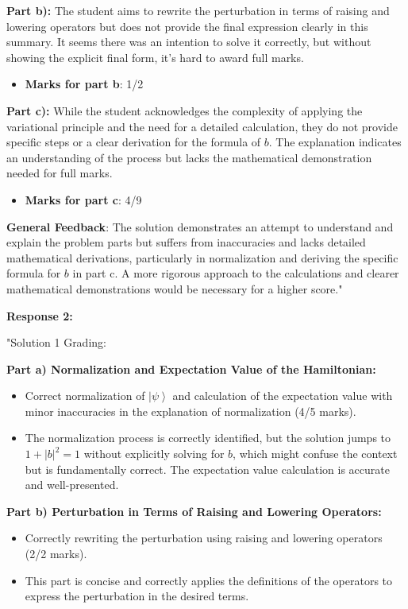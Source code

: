 \documentclass[a4paper,11pt]{article}
\begin{document}
\textbf{Part b):} The student aims to rewrite the perturbation in terms of raising and lowering operators but does not provide the final expression clearly in this summary. It seems there was an intention to solve it correctly, but without showing the explicit final form, it's hard to award full marks.
\begin{itemize}
    \item \textbf{Marks for part b}: 1/2
\end{itemize}

\textbf{Part c):} While the student acknowledges the complexity of applying the variational principle and the need for a detailed calculation, they do not provide specific steps or a clear derivation for the formula of \(b\). The explanation indicates an understanding of the process but lacks the mathematical demonstration needed for full marks.
\begin{itemize}
    \item \textbf{Marks for part c}: 4/9
\end{itemize}

\textbf{General Feedback}: The solution demonstrates an attempt to understand and explain the problem parts but suffers from inaccuracies and lacks detailed mathematical derivations, particularly in normalization and deriving the specific formula for
\(b\) in part c. A more rigorous approach to the calculations and clearer mathematical demonstrations would be necessary for a higher score."

\textbf{Response 2:}

"Solution 1 Grading:

\textbf{Part a) Normalization and Expectation Value of the Hamiltonian:}
\begin{itemize}
    \item Correct normalization of \( \left| \psi \right> \) and calculation of the expectation value with minor inaccuracies in the explanation of normalization (4/5 marks).
    \item The normalization process is correctly identified, but the solution jumps to \( 1 + |b|^2 = 1 \) without explicitly solving for \( b \), which might confuse the context but is fundamentally correct. The expectation value calculation is accurate and well-presented.
\end{itemize}

\textbf{Part b) Perturbation in Terms of Raising and Lowering Operators:}
\begin{itemize}
    \item Correctly rewriting the perturbation using raising and lowering operators (2/2 marks).
    \item This part is concise and correctly applies the definitions of the operators to express the perturbation in the desired terms.
\end{itemize}
\end{document}
